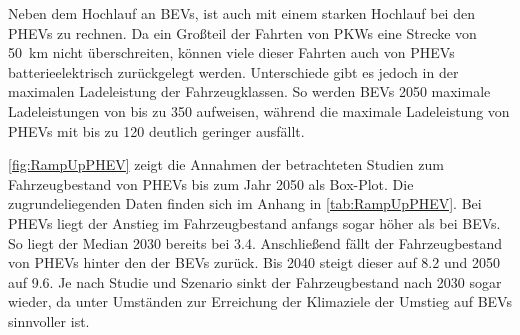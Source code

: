 Neben dem Hochlauf an \glspl{BEV}, ist auch mit einem starken Hochlauf bei den \glspl{PHEV} zu rechnen.
Da ein Großteil der Fahrten von \glspl{PKW} eine Strecke von \SI{50}{\km} nicht überschreiten, können viele dieser Fahrten auch von \glspl{PHEV} batterieelektrisch zurückgelegt werden. \cite{Agora2019}
Unterschiede gibt es jedoch in der maximalen Ladeleistung der Fahrzeugklassen.
So werden \glspl{BEV} \num{2050} maximale Ladeleistungen von bis zu \SI{350}{\kw} aufweisen, während die maximale Ladeleistung von \glspl{PHEV} mit bis zu \SI{120}{\kw} deutlich geringer ausfällt. \cite{Kaul2019}



\autoref{fig:RampUpPHEV} zeigt die Annahmen der betrachteten Studien zum Fahrzeugbestand von \glspl{PHEV} bis zum Jahr \num{2050} als Box-Plot.
Die zugrundeliegenden Daten finden sich im Anhang in \autoref{tab:RampUpPHEV}.
Bei \glspl{PHEV} liegt der Anstieg im Fahrzeugbestand anfangs sogar höher als bei \glspl{BEV}.
So liegt der Median 2030 bereits bei \SI{3.4}{\MioStk}.
Anschließend fällt der Fahrzeugbestand von \glspl{PHEV} hinter den der \glspl{BEV} zurück.
Bis \num{2040} steigt dieser auf \SI{8.2}{\MioStk} und \num{2050} auf \SI{9.6}{\MioStk}.
Je nach Studie und Szenario sinkt der Fahrzeugbestand nach \num{2030} sogar wieder, da unter Umständen zur Erreichung der Klimaziele der Umstieg auf \glspl{BEV} sinnvoller ist.



